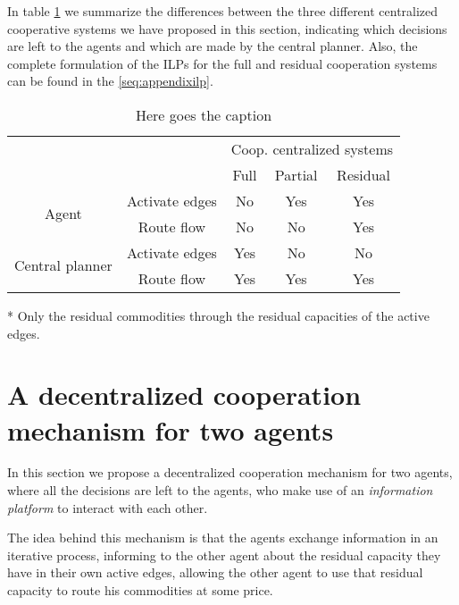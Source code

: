 \documentclass[review]{elsarticle}
\begin{document}
In table \ref{tb:summarycentralizedmodels} we summarize the differences between the three different centralized cooperative systems we have proposed in this section, indicating which decisions are left to the agents and which are made by the central planner. Also, the complete formulation of the ILPs for the full and residual cooperation systems can be found in the \ref{seq:appendixilp}.

\begin{table}[ht!]
	\centering
	\caption{Here goes the caption \label{tb:summarycentralizedmodels}}
    \begin{threeparttable}
        \begin{tabular}{ccccc}
            & &      \multicolumn{3}{c}{Coop. centralized systems} \\\cline{3-5}
            & & Full & Partial & Residual \\ \hline
            \multirow{2}{*}{Agent} & Activate edges & No & Yes & Yes \\
            & Route flow     & No & No & Yes \\\hline
            \multirow{2}{*}{Central planner} & Activate edges & Yes & No & No \\
            & Route flow & Yes & Yes & Yes\tnote{*} \\\bottomrule
        \end{tabular}
    \begin{tablenotes}\footnotesize
        \item[*] Only the residual commodities through the residual capacities
        of the active edges.
        \end{tablenotes}
    \end{threeparttable}
    \end {table}

\section{A decentralized cooperation mechanism for two agents} \label{seq:itermodel}

In this section we propose a decentralized cooperation mechanism for two agents, where all the decisions are left to the agents, who make use of an \emph{information platform} to interact with each other.

The idea behind this mechanism is that the agents exchange information in an iterative process, informing to the other agent about the residual capacity they have in their own active edges, allowing the other agent to use that residual capacity to route his commodities at some price.
\end{document}
